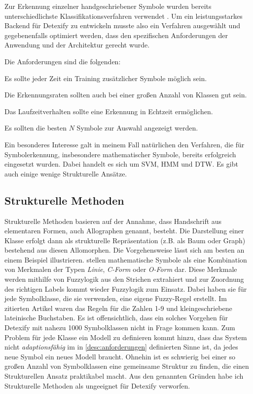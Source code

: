 Zur Erkennung einzelner handgeschriebener Symbole wurden bereits unterschiedlichste Klassifikationsverfahren verwendet \cite{Plamondon:2000p10303}. Um ein leistungsstarkes Backend für Detexify zu entwickeln musste also ein Verfahren ausgewählt und gegebenenfalls optimiert werden, dass den spezifischen Anforderungen der Anwendung und der Architektur gerecht wurde.

Die Anforderungen sind die folgenden:
\begin{description}
  \label{desc:anforderungen}
  \item[Adaptionsfähigkeit] Es sollte jeder Zeit ein Training zusätzlicher Symbole möglich sein.
  \item[Skalierbarkeit] Die Erkennungsraten sollten auch bei einer großen Anzahl von Klassen gut sein.
  \item[Laufzeitverhalten] Das Laufzeitverhalten sollte eine Erkennung in Echtzeit ermöglichen.
  \item[Interaktivität] Es sollten die besten $N$ Symbole zur Auswahl angezeigt werden.
\end{description}

Ein besonderes Interesse galt in meinem Fall natürlichen den Verfahren, die für Symbolerkennung, insbesondere mathematischer Symbole, bereits erfolgreich eingesetzt wurden. Dabei handelt es sich um \ac{SVM}, \ac{HMM} und \ac{DTW}. Es gibt auch einige wenige Strukturelle Ansätze.

\subsection{Strukturelle Methoden} \label{sub:strukturelle_methoden}

Strukturelle Methoden basieren auf der Annahme, dass Handschrift aus elementaren Formen, auch Allographen genannt, besteht. Die Darstellung einer Klasse erfolgt dann als strukturelle Repräsentation (z.B. als Baum oder Graph) bestehend aus diesen Allomorphen. Die Vorgehensweise lässt sich am besten an einem Beispiel illustrieren. \citet{Fitzgerald:2004p10858} stellen mathematische Symbole als eine Kombination von Merkmalen der Typen \emph{Linie}, \emph{C-Form} oder \emph{O-Form} dar. Diese Merkmale werden mithilfe von Fuzzylogik aus den Strichen extrahiert und zur Zuordnung des richtigen Labels kommt wieder Fuzzylogik zum Einsatz. Dabei haben sie für jede Symbolklasse, die sie verwenden, eine eigene Fuzzy-Regel erstellt. Im zitierten Artikel waren das Regeln für die Zahlen 1-9 und kleingeschriebene lateinische Buchstaben. Es ist offensichtlich, dass ein solches Vorgehen für Detexify mit nahezu 1000 Symbolklassen nicht in Frage kommen kann. Zum Problem für jede Klasse ein Modell zu definieren kommt hinzu, dass das System nicht \emph{adaptionsfähig} im in \ref{desc:anforderungen} definierten Sinne ist, da jedes neue Symbol ein neues Modell braucht. Ohnehin ist es schwierig bei einer so großen Anzahl von Symbolklassen eine gemeinsame Struktur zu finden, die einen Strukturellen Ansatz praktikabel macht. Aus den genannten Gründen habe ich Strukturelle Methoden als ungeeignet für Detexify verworfen.


